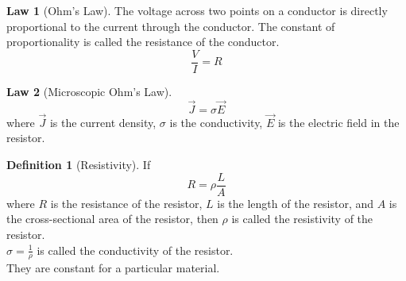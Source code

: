 \documentclass[titlepage, fleqn, a4paper, 12pt, twoside]{article}
\theoremstyle{definition}
\newtheorem{definition}{Definition}
\theoremstyle{theorem}
\newtheorem{law}{Law}
\begin{document}
\begin{law}[Ohm's Law]
	The voltage across two points on a conductor is directly proportional to the current through the conductor.
	The constant of proportionality is called the resistance of the conductor.
	\begin{equation*}
		\frac{V}{I} = R
	\end{equation*}
	\label{Ohm's_Law}
\end{law}

\begin{law}[Microscopic Ohm's Law]
	\begin{equation*}
		\overrightarrow{J}  = \sigma \overrightarrow{E}
	\end{equation*}
	where $\overrightarrow{J}$ is the current density, $\sigma$ is the conductivity, $\overrightarrow{E}$ is the electric field in the resistor.
	\label{Microscopic_Ohm's_Law}
\end{law}

\begin{definition}[Resistivity]
	If
	\begin{equation*}
		R = \rho \frac{L}{A}
	\end{equation*}
	where $R$ is the resistance of the resistor, $L$ is the length of the resistor, and $A$ is the cross-sectional area of the resistor, then $\rho$ is called the resistivity of the resistor.\\
	$\sigma = \frac{1}{\rho}$ is called the conductivity of the resistor.\\
	They are constant for a particular material.
\end{definition}

\begin{figure}[H]
\end{figure}
\end{document}
